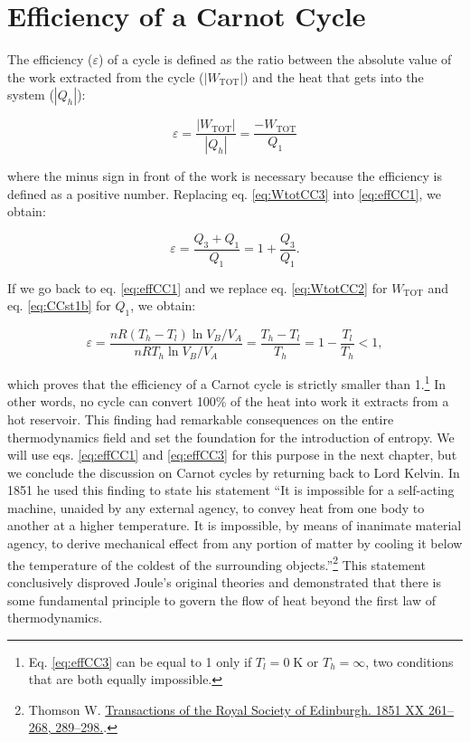 \documentclass[
  9pt,
]{extbook}
\theoremstyle{definition}
\theoremstyle{definition}
\theoremstyle{definition}
\theoremstyle{definition}
\theoremstyle{remark}
\begin{document}
\section{Efficiency of a Carnot Cycle}\label{efficiency-of-a-carnot-cycle}

The efficiency (\(\varepsilon\)) of a cycle is defined as the ratio between the absolute value of the work extracted from the cycle (\(\left| W_{\text{TOT}} \right|\)) and the heat that gets into the system (\(\left| Q_h \right|\)):

\begin{equation}
\varepsilon = \frac{\left| W_{\text{TOT}} \right|}{\left| Q_h \right|} =\frac{-W_{\text{TOT}}}{Q_1}
\label{eq:effCC1}
\end{equation}

where the minus sign in front of the work is necessary because the efficiency is defined as a positive number. Replacing eq. \eqref{eq:WtotCC3} into \eqref{eq:effCC1}, we obtain:

\begin{equation}
\varepsilon = \frac{Q_3+Q_1}{Q_1} = 1+\frac{Q_3}{Q_1}.
\label{eq:effCC2}
\end{equation}

If we go back to eq. \eqref{eq:effCC1} and we replace eq. \eqref{eq:WtotCC2} for \(W_{\mathrm{TOT}}\) and eq. \eqref{eq:CCst1b} for \(Q_1\), we obtain:

\begin{equation}
\varepsilon = \frac{nR \left( T_h - T_l \right) \ln V_B/V_A}{nRT_h \ln V_B/V_A} = \frac{T_h-T_l}{T_h}=1-\frac{T_l}{T_h }<1,
\label{eq:effCC3}
\end{equation}

which proves that the efficiency of a Carnot cycle is strictly smaller than 1.\footnote{Eq. \eqref{eq:effCC3} can be equal to 1 only if \(T_l=0 \; \text{K}\) or \(T_h=\infty\), two conditions that are both equally impossible.} In other words, no cycle can convert 100\% of the heat into work it extracts from a hot reservoir. This finding had remarkable consequences on the entire thermodynamics field and set the foundation for the introduction of entropy. We will use eqs. \eqref{eq:effCC1} and \eqref{eq:effCC3} for this purpose in the next chapter, but we conclude the discussion on Carnot cycles by returning back to Lord Kelvin. In 1851 he used this finding to state his statement ``It is impossible for a self-acting machine, unaided by any external agency, to convey heat from one body to another at a higher temperature. It is impossible, by means of inanimate material agency, to derive mechanical effect from any portion of matter by cooling it below the temperature of the coldest of the surrounding objects.''\footnote{Thomson W. \href{https://www.biodiversitylibrary.org/item/126047\#page/295/mode/1up}{Transactions of the Royal Society of Edinburgh. 1851 XX 261--268, 289--298.}.} This statement conclusively disproved Joule's original theories and demonstrated that there is some fundamental principle to govern the flow of heat beyond the first law of thermodynamics.
\end{document}

